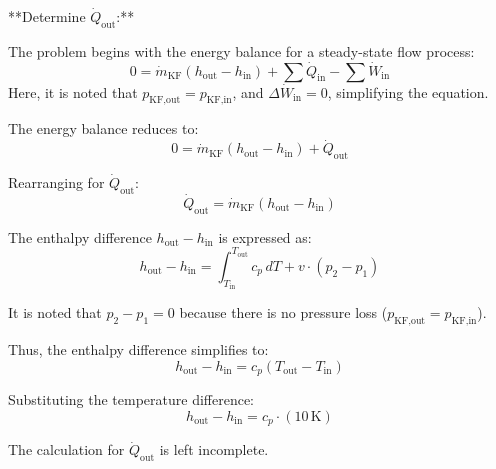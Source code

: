**Determine \( \dot{Q}_{\text{out}} \):**  

The problem begins with the energy balance for a steady-state flow process:  
\[
0 = \dot{m}_{\text{KF}} \left( h_{\text{out}} - h_{\text{in}} \right) + \sum \dot{Q}_{\text{in}} - \sum \dot{W}_{\text{in}}
\]  
Here, it is noted that \( p_{\text{KF,out}} = p_{\text{KF,in}} \), and \( \Delta \dot{W}_{\text{in}} = 0 \), simplifying the equation.  

The energy balance reduces to:  
\[
0 = \dot{m}_{\text{KF}} \left( h_{\text{out}} - h_{\text{in}} \right) + \dot{Q}_{\text{out}}
\]  

Rearranging for \( \dot{Q}_{\text{out}} \):  
\[
\dot{Q}_{\text{out}} = \dot{m}_{\text{KF}} \left( h_{\text{out}} - h_{\text{in}} \right)
\]  

The enthalpy difference \( h_{\text{out}} - h_{\text{in}} \) is expressed as:  
\[
h_{\text{out}} - h_{\text{in}} = \int_{T_{\text{in}}}^{T_{\text{out}}} c_p \, dT + v \cdot (p_2 - p_1)
\]  

It is noted that \( p_2 - p_1 = 0 \) because there is no pressure loss (\( p_{\text{KF,out}} = p_{\text{KF,in}} \)).  

Thus, the enthalpy difference simplifies to:  
\[
h_{\text{out}} - h_{\text{in}} = c_p \left( T_{\text{out}} - T_{\text{in}} \right)
\]  

Substituting the temperature difference:  
\[
h_{\text{out}} - h_{\text{in}} = c_p \cdot (10 \, \text{K})
\]  

The calculation for \( \dot{Q}_{\text{out}} \) is left incomplete.